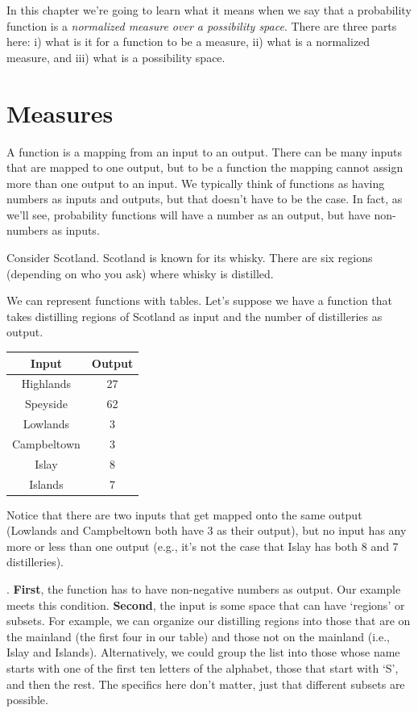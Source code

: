 \documentclass[]{tufte-book}
\begin{document}
In this chapter we're going to learn what it means when we say that a probability function is a \emph{normalized measure over a possibility space}. There are three parts here: i) what is it for a function to be a measure, ii) what is a normalized measure, and iii) what is a possibility space.

\hypertarget{measures}{%
\section{Measures}\label{measures}}

A function is a mapping from an input to an output. There can be many inputs that are mapped to one output, but to be a function the mapping cannot assign more than one output to an input. We typically think of functions as having numbers as inputs and outputs, but that doesn't have to be the case. In fact, as we'll see, probability functions will have a number as an output, but have non-numbers as inputs.

Consider Scotland. Scotland is known for its whisky. There are six regions (depending on who you ask) where whisky is distilled.

We can represent functions with tables. Let's suppose we have a function that takes distilling regions of Scotland as input and the number of distilleries as output.

\begin{longtable}[]{@{}cc@{}}
\toprule
Input & Output\tabularnewline
\midrule
\endhead
Highlands & 27\tabularnewline
Speyside & 62\tabularnewline
Lowlands & 3\tabularnewline
Campbeltown & 3\tabularnewline
Islay & 8\tabularnewline
Islands & 7\tabularnewline
\bottomrule
\end{longtable}

Notice that there are two inputs that get mapped onto the same output (Lowlands and Campbeltown both have 3 as their output), but no input has any more or less than one output (e.g., it's not the case that Islay has both 8 and 7 distilleries).

. \textbf{First}, the function has to have non-negative numbers as output. Our example meets this condition. \textbf{Second}, the input is some space that can have `regions' or subsets. For example, we can organize our distilling regions into those that are on the mainland (the first four in our table) and those not on the mainland (i.e., Islay and Islands). Alternatively, we could group the list into those whose name starts with one of the first ten letters of the alphabet, those that start with `S', and then the rest. The specifics here don't matter, just that different subsets are possible.
\end{document}
